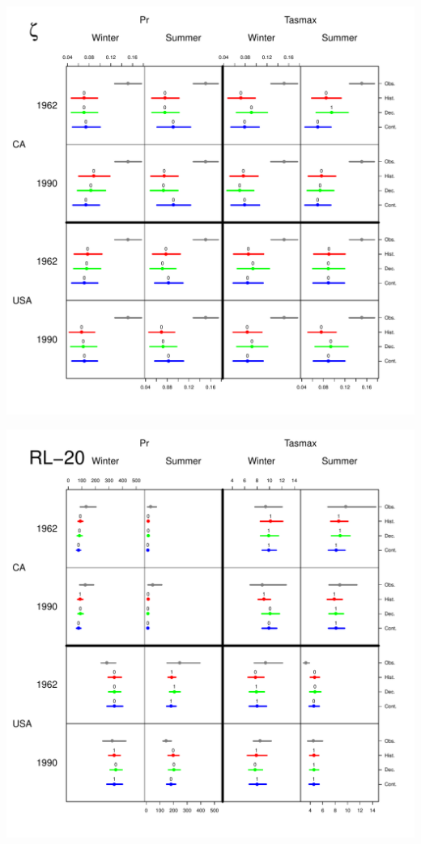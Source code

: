 \documentclass[mathserif, 11pt, t]{beamer}
\begin{document}
\begin{frame}
\begin{center}
\includegraphics[scale=0.34]{figs/zeta.pdf}
\end{center}
\end{frame}

\begin{frame}
\begin{center}
\includegraphics[scale=0.34]{figs/rl20.pdf}
\end{center}
\end{frame}
\end{document}

